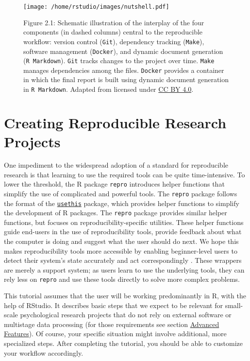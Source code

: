 \documentclass[psych,tutorial,submit,moreauthors,pdftex]{mdpi}
\begin{document}
\begin{figure}
\centering
\texttt{[image: /home/rstudio/images/nutshell.pdf]}
\caption{Figure 2.1: Schematic illustration of the interplay of the four
components (in dashed columns) central to the reproducible workflow:
version control (\texttt{Git}), dependency tracking (\texttt{Make}),
software management (\texttt{Docker}), and dynamic document generation
(\texttt{R\ Markdown}). \texttt{Git} tracks changes to the project over
time. \texttt{Make} manages dependencies among the files.
\texttt{Docker} provides a container in which the final report is built
using dynamic document generation in \texttt{R\ Markdown}. Adapted from
\citet{Peikert2019} licensed under
\href{https://creativecommons.org/licenses/by/4.0}{CC BY 4.0}.}
\end{figure}

\hypertarget{creating-reproducible-research-projects}{%
\section{Creating Reproducible Research
Projects}\label{creating-reproducible-research-projects}}

One impediment to the widespread adoption of a standard for reproducible
research is that learning to use the required tools can be quite
time-intensive. To lower the threshold, the R package \texttt{repro}
introduces helper functions that simplify the use of complicated and
powerful tools. The \texttt{repro} package follows the format of the
\href{https://usethis.r-lib.org}{\texttt{usethis}} \citep{usethis}
package, which provides helper functions to simplify the development of
R packages. The \texttt{repro} package provides similar helper
functions, but focuses on reproducibility-specific utilities. These
helper functions guide end-users in the use of reproducibility tools,
provide feedback about what the computer is doing and suggest what the
user should do next. We hope this makes reproducibility tools more
accessible by enabling beginner-level users to detect their system's
state accurately and act correspondingly \citep[Chapter 8: ``Automation
and Situation Awareness'']{parasuramanAutomationHumanPerformance2018}.
These wrappers are merely a support system; as users learn to use the
underlying tools, they can rely less on \texttt{repro} and use these
tools directly to solve more complex problems.

This tutorial assumes that the user will be working predominantly in R,
with the help of RStudio. It describes basic steps that we expect to be
relevant for small-scale psychological research projects that do not
rely on external software or multistage data processing (for those
requirements see section \protect\hyperlink{advanced-features}{Advanced
Features}). Of course, your specific situation might involve additional,
more specialized steps. After completing the tutorial, you should be
able to customize your workflow accordingly.
\end{document}
